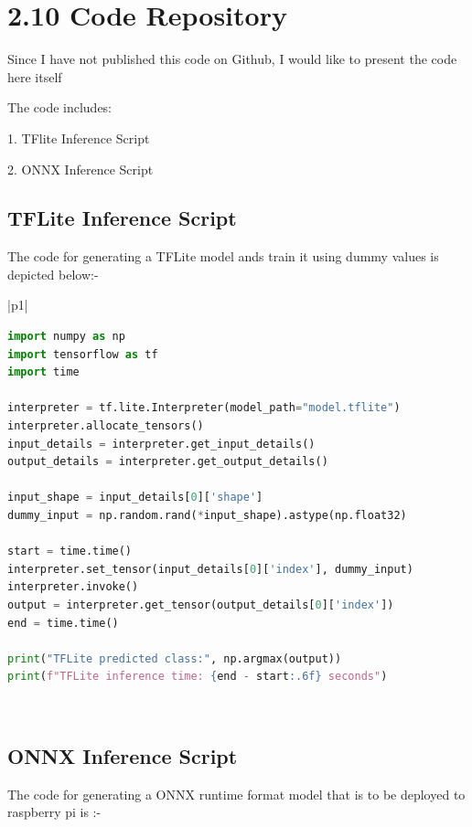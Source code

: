 \documentclass[12pt]{article}
\begin{document}
\section*{2.10 Code Repository}
Since I have not published this code on Github, I would like to present the code here itself 

 The code includes:

 1. TFlite Inference Script

2. ONNX Inference Script


\subsection*{TFLite Inference Script}
The code for generating a TFLite model ands train it using dummy values is depicted below:- 

\begin{table}[H]
\centering
\begin{tabular}{|p{1\textwidth}|}
\hline
\begin{minipage}{\linewidth}
\begin{lstlisting}[language=Python]
import numpy as np
import tensorflow as tf
import time

interpreter = tf.lite.Interpreter(model_path="model.tflite")
interpreter.allocate_tensors()
input_details = interpreter.get_input_details()
output_details = interpreter.get_output_details()

input_shape = input_details[0]['shape']
dummy_input = np.random.rand(*input_shape).astype(np.float32)

start = time.time()
interpreter.set_tensor(input_details[0]['index'], dummy_input)
interpreter.invoke()
output = interpreter.get_tensor(output_details[0]['index'])
end = time.time()

print("TFLite predicted class:", np.argmax(output))
print(f"TFLite inference time: {end - start:.6f} seconds")
\end{lstlisting}
\end{minipage}
\\ \hline
\end{tabular}
\caption{TFLite inference script inside a table}
\end{table}


\subsection*{ONNX Inference Script}
The code for generating a ONNX runtime format model that is to be deployed to raspberry pi is :-
\end{document}

